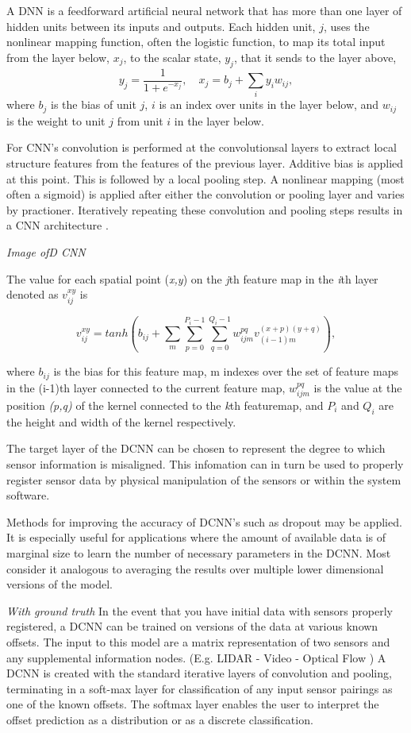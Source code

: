 \documentclass{article}
\begin{document}
A DNN is a feedforward artificial neural network that has more than one layer of hidden units
between its inputs and outputs. Each hidden unit, $j$, uses the
nonlinear mapping function, often the logistic function, to map its total input from the layer below, $x_j$,
to the scalar state, $y_j$, that it sends to the layer above,
\[
y_j = \frac{1}{1+e^{-x_j}}, \quad x_j = b_j+\sum_iy_iw_{ij},
\]
where $b_j$ is the bias of unit $j$, $i$ is an index over units in the
layer below, and $w_{ij}$ is the weight to unit $j$ from unit $i$ in
the layer below. 

For CNN's convolution is performed at the convolutionsal layers to extract local structure features from the features of the previous layer. Additive bias is applied at this point. This is followed by a local pooling step. A nonlinear mapping (most often a sigmoid) is applied after either the convolution or pooling layer and varies by practioner.  Iteratively repeating these convolution and pooling steps results in a CNN architecture \cite{2013ImageClassification} \cite{LeCunCNN2}.

\emph{Image ofD CNN}

The value for each spatial point (\emph{x,y}) on the \emph{j}th feature map in the \emph{i}th layer denoted as $v^{xy}_{ij}$ is

\[{v^{xy}_{ij}}=tanh(b_{ij}+\sum_m\sum_{p=0}^{P_{i}-1}\sum_{q=0}^{Q_{i}-1}w^{pq}_{ijm}v^{(x+p)(y+q)}_{(i-1)m}),
\]
 
where $b_{ij}$ is the bias for this feature map, m indexes over the set of feature maps in the (i-1)th layer connected to the current feature map, $w^{pq}_{ijm}$ is the value at the position \emph{(p,q)} of the kernel connected to the \emph{k}th featuremap, and \emph{$P_i$} and \emph{$Q_i$} are the height and width of the kernel respectively. 

The target layer of the DCNN can be chosen to represent the degree to which sensor information is misaligned. This infomation can in turn be used to properly register sensor data by physical manipulation of the sensors or within the system software. 

Methods for improving the accuracy of DCNN's such as dropout may be applied. It is especially useful for applications where the amount of available data is of marginal size to learn the number of necessary parameters in the DCNN. Most consider it analogous to averaging the results over multiple lower dimensional versions of the model. 

\emph{With ground truth}
In the event that you have initial data with sensors properly registered, a DCNN can be trained on versions of the data at various known offsets. The input to this model are a matrix representation of two sensors and any supplemental information nodes. (E.g. LIDAR - Video - Optical Flow ) A DCNN is created with the standard iterative layers of convolution and pooling, terminating in a soft-max layer for classification of any input sensor pairings as one of the known offsets. The softmax layer enables the user to interpret the offset prediction as a distribution or as a discrete classification.
\end{document}
